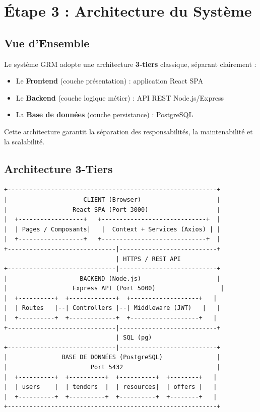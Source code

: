 \chapter{Étape 3 : Architecture du Système}

\section{Vue d'Ensemble}

Le système GRM adopte une architecture \textbf{3-tiers} classique, séparant clairement :
\begin{itemize}
    \item Le \textbf{Frontend} (couche présentation) : application React SPA
    \item Le \textbf{Backend} (couche logique métier) : API REST Node.js/Express
    \item La \textbf{Base de données} (couche persistance) : PostgreSQL
\end{itemize}

Cette architecture garantit la séparation des responsabilités, la maintenabilité et la scalabilité.

\section{Architecture 3-Tiers}

\begin{verbatim}
+----------------------------------------------------------+
|                     CLIENT (Browser)                     |
|                  React SPA (Port 3000)                   |
|  +------------------+   +-----------------------------+  |
|  | Pages / Composants|   |  Context + Services (Axios) | |
|  +------------------+   +-----------------------------+  |
+------------------------------|---------------------------+
                               | HTTPS / REST API
+------------------------------|---------------------------+
|                    BACKEND (Node.js)                     |
|                  Express API (Port 5000)                  |
|  +----------+  +-------------+  +-------------------+   |
|  | Routes   |--| Controllers |--| Middleware (JWT)   |   |
|  +----------+  +-------------+  +-------------------+   |
+------------------------------|---------------------------+
                               | SQL (pg)
+------------------------------|---------------------------+
|               BASE DE DONNÉES (PostgreSQL)               |
|                       Port 5432                          |
|  +----------+  +----------+  +----------+  +--------+   |
|  | users    |  | tenders  |  | resources|  | offers |   |
|  +----------+  +----------+  +----------+  +--------+   |
+----------------------------------------------------------+
\end{verbatim}

